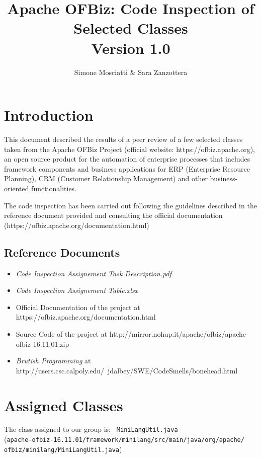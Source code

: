\documentclass[11pt]{article} %
\title{Apache OFBiz: Code Inspection of Selected Classes \\ {\Large Version 1.0}}
\author{Simone Mosciatti \& Sara Zanzottera}
\begin{document}
\maketitle
\newpage
\tableofcontents
\newpage

\section{Introduction}
This document described the results of a peer review of a few selected classes taken from the Apache OFBiz Project (official website: https://ofbiz.apache.org), an open source product for the automation of enterprise processes that includes framework components and business applications for ERP (Enterprise Resource Planning), CRM (Customer Relationship Management) and other business-oriented functionalities.
 
The code inspection has been carried out following the guidelines described in the reference document provided and consulting the official documentation \\ (https://ofbiz.apache.org/documentation.html) 

\subsection{Reference Documents}
\begin{itemize}
	\item \textit{Code Inspection Assignement Task Description.pdf}
	\item \textit{Code Inspection Assignement Table.xlsx}
	\item Official Documentation of the project at https://ofbiz.apache.org/documentation.html
	\item Source Code of the project at http://mirror.nohup.it/apache/ofbiz/apache-ofbiz-16.11.01.zip
	\item \textit{Brutish Programming} at 
http://users.csc.calpoly.edu/~jdalbey/SWE/CodeSmells/bonehead.html
\end{itemize}


\section{Assigned Classes}

The class assigned to our group is:  \texttt{ {\large MiniLangUtil.java} }  \hfill\\
(\texttt{apache-ofbiz-16.11.01/framework/minilang/src/main/java/org/apache/ \\ 
ofbiz/minilang/MiniLangUtil.java})
\end{document}
